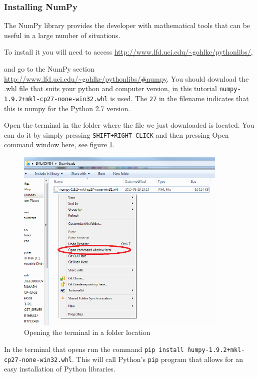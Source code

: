 \subsubsection{Installing NumPy}

The NumPy library provides the developer with mathematical tools that can be useful in a large number of situations.

To install it you will need to access \url{http://www.lfd.uci.edu/~gohlke/pythonlibs/}, 

and go to the NumPy section
 \url{http://www.lfd.uci.edu/~gohlke/pythonlibs/\#numpy}.
 You should download the .whl file that suits your python and computer version, in this tutorial \texttt{numpy-1.9.2+mkl-cp27-none-win32.whl} is used. The \texttt{27} in the filename indicates that this is numpy for the Python 2.7 version.

Open the terminal in the folder where the file we just downloaded is located. You can do it by simply pressing \texttt{SHIFT+RIGHT CLICK} and then pressing Open command window here, see figure \ref{fig:numpy_install_open_terminal}.

\begin{figure}[h!]
  \centering
    \includegraphics[width=0.9\textwidth]{numpy_install_open_terminal_highlighted}
    \caption{Opening the terminal in a folder location \label{fig:numpy_install_open_terminal} }
\end{figure}

In the terminal that opens run the command \texttt{pip install \"numpy-1.9.2+mkl-cp27-none-win32.whl\"}. This will call Python's \texttt{pip} program that allows for an easy installation of Python libraries. 

